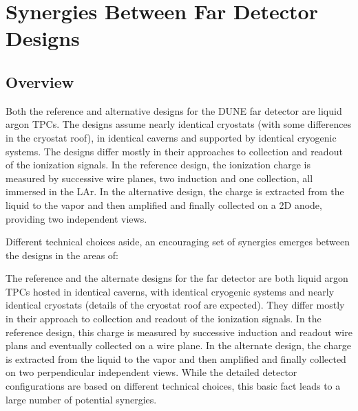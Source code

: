 \chapter{Synergies Between Far Detector Designs}
\label{ch:detectors-synergy}

\section{Overview}


Both the reference and alternative designs for the DUNE far detector are 
liquid argon TPCs. The designs assume nearly identical cryostats (with some differences in the
cryostat roof), in identical caverns and supported by identical
cryogenic systems. The designs differ mostly in their
approaches to collection and readout of the ionization signals. In the
reference design, the ionization charge is measured by successive wire planes, two induction and
one collection, all immersed in the LAr. In the
alternative design, the charge is extracted from the liquid to the
vapor and then amplified and finally collected on a 2D anode, providing two %
independent views. 

Different technical choices aside, an encouraging set of synergies emerges between the designs in the areas of: 

The reference and the alternate designs for the far detector are both
liquid argon TPCs hosted in identical caverns, with identical
cryogenic systems and nearly identical cryostats (details of the
cryostat roof are expected). They differ mostly in their
approach to collection and readout of the ionization signals. In the
reference design, this charge is measured by successive induction and
readout wire plans and eventually collected on a wire plane. In the
alternate design, the charge is extracted from the liquid to the
vapor and then amplified and finally collected on two perpendicular
independent views. While the detailed detector configurations are
based on different technical choices, this basic fact leads to a large
number of potential synergies.

